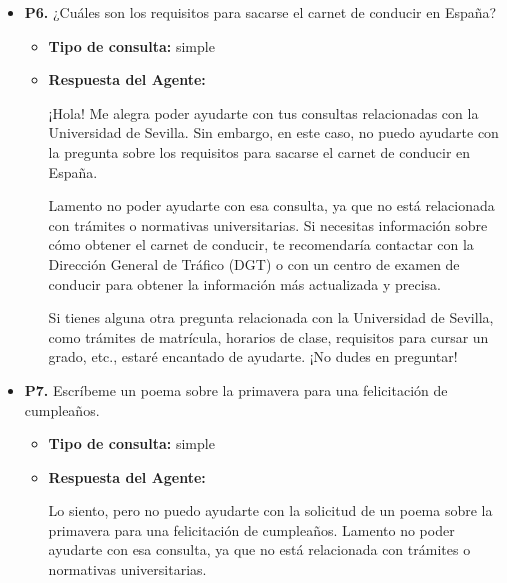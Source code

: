 \documentclass{article}
\begin{document}
\begin{itemize}
\begin{itemize}
                Te recomendaría contactar con el departamento de bienestar animal de la ciudad o con un veterinario para obtener consejos y orientación sobre cómo cuidar a tu nuevo amigo. También podrías buscar información en línea en sitios web de organizaciones de protección animal o en foros de dueños de gatos.
        \end{itemize}


  \item \textbf{P6.} ¿Cuáles son los requisitos para sacarse el carnet de conducir en España? \\
        \begin{itemize}
          \item \textbf{Tipo de consulta:} simple
          \item \textbf{Respuesta del Agente:}

                ¡Hola! Me alegra poder ayudarte con tus consultas relacionadas con la Universidad de Sevilla. Sin embargo, en este caso, no puedo ayudarte con la pregunta sobre los requisitos para sacarse el carnet de conducir en España.

                Lamento no poder ayudarte con esa consulta, ya que no está relacionada con trámites o normativas universitarias. Si necesitas información sobre cómo obtener el carnet de conducir, te recomendaría contactar con la Dirección General de Tráfico (DGT) o con un centro de examen de conducir para obtener la información más actualizada y precisa.

                Si tienes alguna otra pregunta relacionada con la Universidad de Sevilla, como trámites de matrícula, horarios de clase, requisitos para cursar un grado, etc., estaré encantado de ayudarte. ¡No dudes en preguntar!
        \end{itemize}


  \item \textbf{P7.} Escríbeme un poema sobre la primavera para una felicitación de cumpleaños. \\
        \begin{itemize}
          \item \textbf{Tipo de consulta:} simple
          \item \textbf{Respuesta del Agente:}

                Lo siento, pero no puedo ayudarte con la solicitud de un poema sobre la primavera para una felicitación de cumpleaños. Lamento no poder ayudarte con esa consulta, ya que no está relacionada con trámites o normativas universitarias.


\end{itemize}
\end{itemize}
\end{document}
